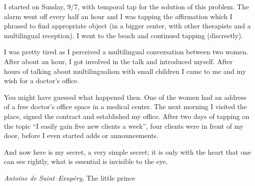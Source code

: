 \documentclass[../main.tex]{subfiles}
\begin{document}
{  I started on Sunday, 9/7, with temporal tap for the solution of this problem.
  The alarm went off every half an hour and I was tapping the affirmation which I phrased to find
  appropriate object (in a bigger center, with other therapists and a multilingual reception).
  I went to the beach and continued tapping (discreetly).

  I was pretty tired as I perceived a multilingual conversation between two women.
  After about an hour, I got involved in the talk and introduced myself.
  After hours of talking about multilingualism with small children I came to me and my wish for a doctor's office.

  You might have guessed what happened then. One of the women had an address of a free doctor's office space in a medical center.
  The next morning I visited the place, signed the contract and established my office.
  After two days of tapping on the topic ``I easily gain five new clients a week'', four clients were in front of my door, before I even started adds or announcements.
  }

\setlength{}
  \epigraph{And now here is my secret, a very simple secret; it is only with the heart that one can see rightly,
    what is essential is invisible to the eye.}{\textit{Antoine de Saint--Exup\'ery}, The little prince}
\setlength{}
\end{document}
